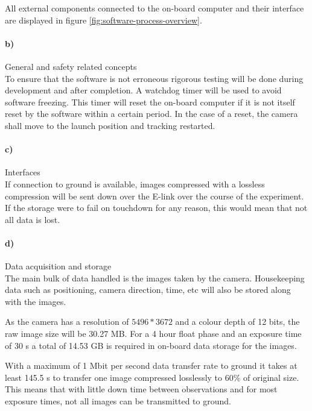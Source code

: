 All external components connected to the on-board computer and their interface are displayed in figure \ref{fig:software-process-overview}.

\paragraph{b)} General and safety related concepts\\

To ensure that the software is not erroneous rigorous testing will be done during development and after completion. A watchdog timer will be used to avoid software freezing. This timer will reset the on-board computer if it is not itself reset by the software within a certain period. In the case of a reset, the camera shall move to the launch position and tracking restarted.

\paragraph{c)} Interfaces\\

If connection to ground is available, images compressed with a lossless compression will be sent down over the E-link over the course of the experiment. If the storage were to fail on touchdown for any reason, this would mean that not all data is lost.





\paragraph{d)} Data acquisition and storage\\

The main bulk of data handled is the images taken by the camera. Housekeeping data such as positioning, camera direction, time, etc will also be stored along with the images.

As the camera has a resolution of $5496 * 3672$ and a colour depth of 12 bits, the raw image size will be 30.27 MB. For a 4 hour float phase and an exposure time of 30 s a total of  14.53 GB is required in on-board data storage for the images. 

With a maximum of 1 Mbit per second data transfer rate to ground it takes at least 145.5 s to transfer one image compressed losslessly to 60\% of original size. This means that with little down time between observations and for most exposure times, not all images can be transmitted to ground.

